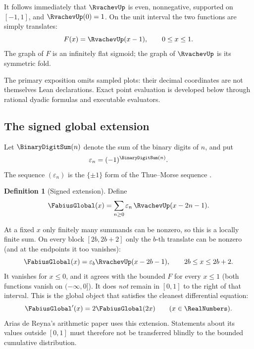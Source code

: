 \documentclass[11pt,oneside]{article}
\theoremstyle{definition}
\newtheorem{definition}[theorem]{Definition}
\theoremstyle{remark}
\begin{document}
It follows immediately that $\RvachevUp$ is even, nonnegative, supported on $[-1,1]$, and
$\RvachevUp(0)=1$.  On the unit interval the two functions are simply translates:
\begin{equation}
 F(x)=\RvachevUp(x-1),\qquad 0\le x\le1.                          \label{eq:F-up-translate}
\end{equation}
The graph of $F$ is an infinitely flat sigmoid; the graph of $\RvachevUp$ is its symmetric fold.

The primary exposition omits sampled plots: their decimal coordinates are not themselves
Lean declarations.  Exact point evaluation is developed below through rational dyadic
formulas and executable evaluators.

\subsection{The signed global extension}

Let $\BinaryDigitSum(n)$ denote the sum of the binary digits of $n$, and put
\begin{equation}
 \varepsilon_n=(-1)^{\BinaryDigitSum(n)}.                             \label{eq:tm-sign}
\end{equation}
The sequence $(\varepsilon_n)$ is the $\{\pm1\}$ form of the Thue--Morse sequence
\cite{allouche2003}.

\begin{definition}[Signed extension]
Define
\begin{equation}
 \FabiusGlobal(x)=\sum_{n\ge0}\varepsilon_n\,
   \RvachevUp(x-2n-1).                                            \label{eq:global-extension}
\end{equation}
\end{definition}

At a fixed $x$ only finitely many summands can be nonzero, so this is a locally finite sum.
On every block $[2b,2b+2]$ only the $b$-th translate can be nonzero
(and at the endpoints it too vanishes):
\begin{equation}
 \FabiusGlobal(x)=\varepsilon_b\RvachevUp(x-2b-1),
 \qquad 2b\le x\le 2b+2.                                  \label{eq:single-block}
\end{equation}
It vanishes for $x\le0$, and it agrees with the bounded $F$ for every $x\le1$
(both functions vanish on $(-\infty,0]$).  It does
\emph{not} remain in $[0,1]$ to the right of that interval.  This is the global object that
satisfies the cleanest differential equation:
\begin{equation}
 \FabiusGlobal'(x)=2\FabiusGlobal(2x)\qquad(x\in\RealNumbers).             \label{eq:global-diffeq}
\end{equation}
Arias de Reyna's arithmetic paper uses this extension.  Statements about its values outside
$[0,1]$ must therefore not be transferred blindly to the bounded cumulative distribution.
\end{document}
